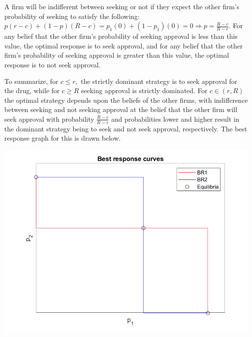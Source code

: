 \documentclass[11pt]{article} %
\begin{document}
A firm will be indifferent between seeking or not if they expect the other firm's probability of seeking to satisfy the following: $p(r-c) + (1-p)(R-c) = p_1(0) + (1-p_1)(0) = 0 \Rightarrow p = \frac{R-c}{R-r}.$ For any belief that the other firm's probability of seeking approval is less than this value, the optimal response is to seek approval, and for any belief that the other firm's probability of seeking approval is greater than this value, the optimal response is to not seek approval. 

To summarize, for $c\leq r,$ the strictly dominant strategy is to seek approval for the drug, while for $c\geq R$ seeking approval is strictly dominated. For $c \in (r,R)$ the optimal strategy depends upon the beliefs of the other firms, with indifference between seeking and not seeking approval at the belief that the other firm will seek approval with probability $\frac{R-c}{R-r}$ and probabilities lower and higher result in the dominant strategy being to seek and not seek approval, respectively. The best response graph for this is drawn below.

\includegraphics{fig2}
\end{document}
